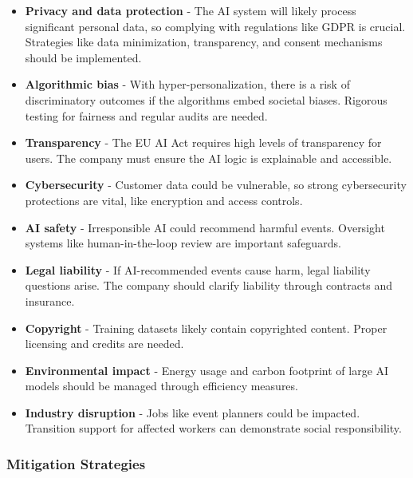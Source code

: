 \begin{itemize}
\item \textbf{Privacy and data protection} - The AI system will likely process significant personal data, so complying with regulations like GDPR is crucial. Strategies like data minimization, transparency, and consent mechanisms should be implemented.

\item \textbf{Algorithmic bias} - With hyper-personalization, there is a risk of discriminatory outcomes if the algorithms embed societal biases. Rigorous testing for fairness and regular audits are needed.

\item \textbf{Transparency} - The EU AI Act requires high levels of transparency for users. The company must ensure the AI logic is explainable and accessible.

\item \textbf{Cybersecurity} - Customer data could be vulnerable, so strong cybersecurity protections are vital, like encryption and access controls.

\item \textbf{AI safety} - Irresponsible AI could recommend harmful events. Oversight systems like human-in-the-loop review are important safeguards.

\item \textbf{Legal liability} - If AI-recommended events cause harm, legal liability questions arise. The company should clarify liability through contracts and insurance.

\item \textbf{Copyright} - Training datasets likely contain copyrighted content. Proper licensing and credits are needed.

\item \textbf{Environmental impact} - Energy usage and carbon footprint of large AI models should be managed through efficiency measures.

\item \textbf{Industry disruption} - Jobs like event planners could be impacted. Transition support for affected workers can demonstrate social responsibility.
\end{itemize}

\subsubsection{Mitigation Strategies}

